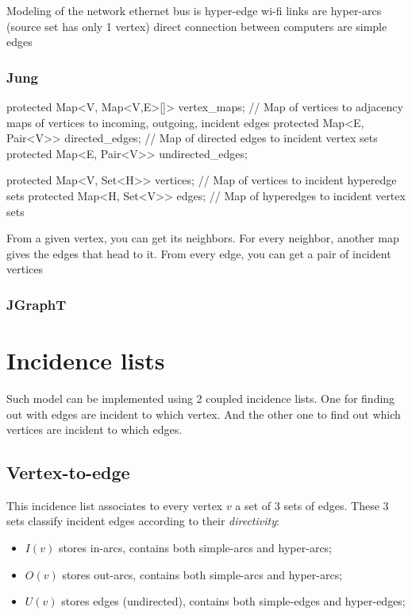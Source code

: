 \documentclass{article}
\begin{document}
Modeling of the network
ethernet bus is hyper-edge
wi-fi links are hyper-arcs (source set has only 1 vertex)
direct connection between computers are simple edges


\subsubsection{Jung}

 protected Map<V, Map<V,E>[]> vertex_maps; // Map of vertices to adjacency maps of vertices to {incoming, outgoing, incident} edges
    protected Map<E, Pair<V>> directed_edges;    // Map of directed edges to incident vertex sets
    protected Map<E, Pair<V>> undirected_edges;  


    protected Map<V, Set<H>> vertices; // Map of vertices to incident hyperedge sets
    protected Map<H, Set<V>> edges;    // Map of hyperedges to incident vertex sets
 


From a given vertex, you can get its neighbors. For every neighbor, another map gives the edges that head to it.
From every edge, you can get a pair of incident vertices




\subsubsection{JGraphT}





\section{Incidence lists}

Such model can be implemented using 2 coupled incidence lists. One for finding out with edges are incident to
which vertex. And the other one to find out which vertices are incident to which edges.


\subsection{Vertex-to-edge}

This incidence list associates to every vertex $v$ a set of 3 sets of edges. These 3 sets classify incident edges according to their \textit{directivity}:
\begin{itemize}
  \item $I(v)$ stores in-arcs, contains both simple-arcs and hyper-arcs;
  \item $O(v)$ stores out-arcs, contains both simple-arcs and hyper-arcs;
  \item $U(v)$ stores edges (undirected), contains both simple-edges and hyper-edges;
\end{itemize}
\end{document}
